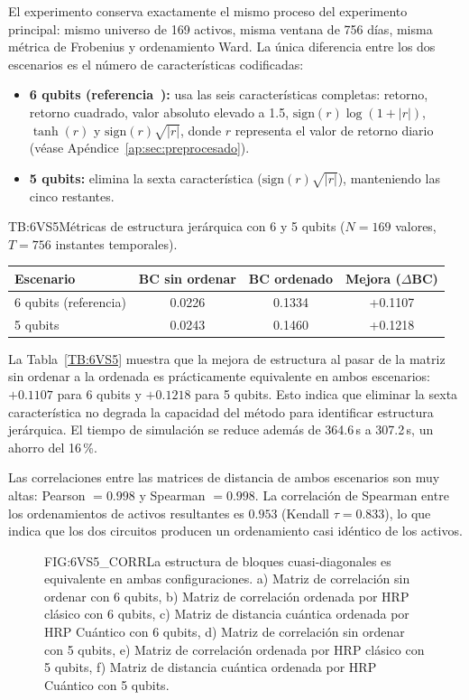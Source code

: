 El experimento conserva exactamente el mismo proceso del experimento principal: mismo universo de 169 activos, misma ventana de 756 días, misma métrica de Frobenius y ordenamiento Ward. La única diferencia entre los dos escenarios es el número de características codificadas:

\begin{itemize}
    \item \textbf{6 qubits (referencia~\cite{arian2025qhrp}):} usa las seis características completas: retorno, retorno cuadrado, valor absoluto elevado a 1.5, $\mathrm{sign}(r)\log(1+|r|)$, $\tanh(r)$ y $\mathrm{sign}(r)\sqrt{|r|}$, donde $r$ representa el valor de retorno diario (véase Apéndice~\ref{ap:sec:preprocesado}).
    \item \textbf{5 qubits:} elimina la sexta característica ($\mathrm{sign}(r)\sqrt{|r|}$), manteniendo las cinco restantes.
\end{itemize}

\begin{table}[Comparativa 6 vs 5 qubits]{TB:6VS5}{Métricas de estructura jerárquica con 6 y 5 qubits (\(N=169\) valores, \(T=756\) instantes temporales).}
\begin{tabular}{lccc}
\hline
\textbf{Escenario} & \textbf{BC sin ordenar} & \textbf{BC ordenado} & \textbf{Mejora ($\Delta$BC)} \\
\hline
6 qubits (referencia) & 0.0226 & 0.1334 & +0.1107 \\
5 qubits              & 0.0243 & 0.1460 & +0.1218 \\
\hline
\end{tabular}
\end{table}

La Tabla~\ref{TB:6VS5} muestra que la mejora de estructura al pasar de la matriz sin ordenar a la ordenada es prácticamente equivalente en ambos escenarios: $+0.1107$ para 6 qubits y $+0.1218$ para 5 qubits. Esto indica que eliminar la sexta característica no degrada la capacidad del método para identificar estructura jerárquica. El tiempo de simulación se reduce además de 364.6\,s a 307.2\,s, un ahorro del 16\,\%.

Las correlaciones entre las matrices de distancia de ambos escenarios son muy altas: Pearson $= 0.998$ y Spearman $= 0.998$. La correlación de Spearman entre los ordenamientos de activos resultantes es $0.953$ (Kendall $\tau = 0.833$), lo que indica que los dos circuitos producen un ordenamiento casi idéntico de los activos.

\begin{figure}[Matrices de correlación 6 vs 5 qubits]{FIG:6VS5_CORR}{La estructura de bloques cuasi-diagonales es equivalente en ambas configuraciones. a) Matriz de correlación sin ordenar con 6 qubits, b) Matriz de correlación ordenada por HRP clásico con 6 qubits, c) Matriz de distancia cuántica ordenada por HRP Cuántico con 6 qubits, d) Matriz de correlación sin ordenar con 5 qubits, e) Matriz de correlación ordenada por HRP clásico con 5 qubits, f) Matriz de distancia cuántica ordenada por HRP Cuántico con 5 qubits.}
\end{figure}

